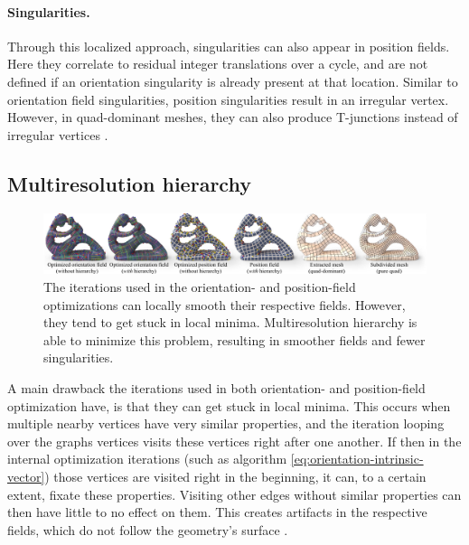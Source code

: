 \documentclass{ACGSeminar}
\begin{document}
\paragraph{Singularities.}
Through this localized approach, singularities can also appear in position fields. Here they correlate to residual integer translations over a cycle, and are not defined if an orientation singularity is already present at that location. Similar to orientation field singularities, position singularities result in an irregular vertex. However, in quad-dominant meshes, they can also produce T-junctions instead of irregular vertices \cite{jakob2015instant}.

\subsection{Multiresolution hierarchy}
\begin{figure}[htb!]
	\begin{centering}
		\includegraphics[width=\textwidth]{img/multiresolution-hierarchy.png}\par
	\end{centering}
	\caption{The iterations used in the orientation- and position-field optimizations can locally smooth their respective fields. However, they tend to get stuck in local minima. Multiresolution hierarchy is able to minimize this problem, resulting in smoother fields and fewer singularities. \cite{jakob2015instant}}
	\label{fig:multireolution-hierarchy}
\end{figure}

A main drawback the iterations used in both orientation- and position-field optimization have, is that they can get stuck in local minima. This occurs when multiple nearby vertices have very similar properties, and the iteration looping over the graphs vertices visits these vertices right after one another. If then in the internal optimization iterations (such as algorithm \eqref{eq:orientation-intrinsic-vector}) those vertices are visited right in the beginning, it can, to a certain extent, fixate these properties. Visiting other edges without similar properties can then have little to no effect on them.  This creates artifacts in the respective fields, which do not follow the geometry's surface \cite{jakob2015instant}. \bigskip
\end{document}
